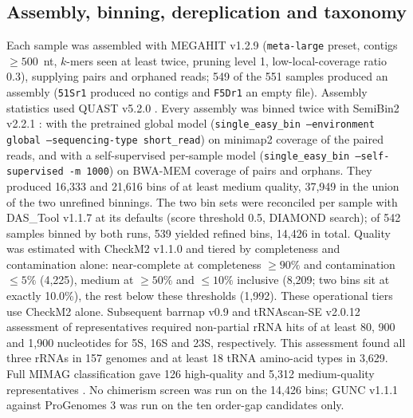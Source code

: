 \documentclass[11pt]{article}
\begin{document}
\subsection*{Assembly, binning, dereplication and taxonomy}
Each sample was assembled with MEGAHIT v1.2.9 \citep{li2015megahit} (\texttt{meta-large} preset,
contigs $\geq 500$~nt, $k$-mers seen at least twice, pruning level 1, low-local-coverage ratio 0.3),
supplying pairs and orphaned reads; 549 of the 551 samples produced an assembly (\texttt{51Sr1}
produced no contigs and \texttt{F5Dr1} an empty file). Assembly statistics used QUAST v5.2.0
\citep{gurevich2013quast}. Every assembly was binned twice with SemiBin2 v2.2.1
\citep{pan2023semibin2}: with the pretrained global model (\texttt{single\_easy\_bin --environment
global --sequencing-type short\_read}) on minimap2 \citep{li2018minimap2} coverage of the paired
reads, and with a self-supervised per-sample model (\texttt{single\_easy\_bin --self-supervised -m
1000}) on BWA-MEM \citep{li2013bwamem} coverage of pairs and orphans. They produced 16{,}333 and
21{,}616 bins of at least medium quality, 37{,}949 in the union of the two unrefined binnings. The
two bin sets were reconciled per sample with DAS\_Tool v1.1.7 \citep{sieber2018dastool} at its
defaults (score threshold 0.5, DIAMOND search); of 542 samples binned by both runs, 539 yielded
refined bins, 14{,}426 in total. Quality was estimated with CheckM2 v1.1.0 \citep{chklovski2023checkm2}
and tiered by completeness and contamination alone: near-complete at completeness $\geq 90\%$ and
contamination $\leq 5\%$ (4{,}225), medium at $\geq 50\%$ and $\leq 10\%$ inclusive (8{,}209; two
bins sit at exactly 10.0\%), the rest below these thresholds (1{,}992). These operational tiers use CheckM2 alone. Subsequent barrnap v0.9 and tRNAscan-SE v2.0.12 \citep{chan2021trnascan} assessment of representatives required non-partial rRNA hits of at least 80, 900 and 1{,}900 nucleotides for 5S, 16S and 23S, respectively. This assessment found all three rRNAs in 157 genomes and at least 18 tRNA amino-acid types in 3{,}629. Full MIMAG classification gave 126 high-quality and 5{,}312 medium-quality representatives \citep{bowers2017mimag}. No chimerism screen was
run on the 14{,}426 bins; GUNC v1.1.1 \citep{orakov2021gunc} against ProGenomes 3 was run on the ten
order-gap candidates only.
\end{document}
